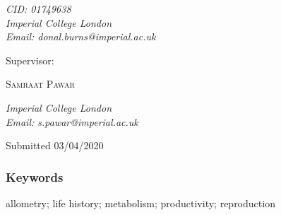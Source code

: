 \begin{titlepage}
	\vspace{0.5\baselineskip} %
	
	\textit{CID: 01749638 \\ Imperial College London \\ Email: donal.burns@imperial.ac.uk} %
	
	\vspace*{2\baselineskip} %
	

	
	Supervisor:
	
	
	\vspace{0.5\baselineskip} %
	
	{\scshape\Large Samraat Pawar \\} %
	
	\vspace{0.5\baselineskip} %
	
	\textit{Imperial College London \\ Email: s.pawar@imperial.ac.uk} %
	
	\vspace{3cm} %
	
	
	\crest %
	
	\vspace{0.3\baselineskip} %
	
	Submitted 03/04/2020 %
	

\end{titlepage}


\linenumbers

\subsubsection*{Keywords}
allometry; life history; metabolism; productivity;  reproduction

